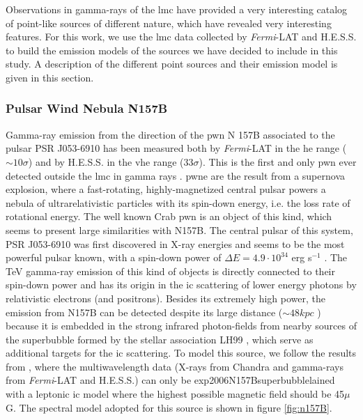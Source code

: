 \documentclass[main.tex]{subfiles}
\begin{document}
Observations in gamma-rays of the \gls{lmc} have provided a very interesting catalog of point-like sources of different nature, which have revealed very interesting features. For this work, we use the \gls{lmc} data collected by \textit{Fermi}-LAT \cite{2010FermiLATLMC11months} \cite{2016LMCFermiLAT} and H.E.S.S. \cite{2012HESSLMC} \cite{2015HESSTeVLMC} \cite{2017HESSLMCP3} to build the emission models of the sources we have decided to include in this study. A description of the different point sources and their emission model is given in this section.

\subsubsection{Pulsar Wind Nebula N157B}

Gamma-ray emission from the direction of the \gls{pwn} N 157B associated to the pulsar  PSR J053-6910 has been measured both by \textit{Fermi}-LAT in the \gls{he} range ($\sim 10 \sigma$) and by H.E.S.S. in the \gls{vhe} range ($33 \sigma$). This is the first and only \gls{pwn} ever detected outside the \gls{lmc} in gamma rays \cite{2012HESSN157B}. \gls{pwne} are the result from  a supernova explosion, where a fast-rotating, highly-magnetized central pulsar powers a nebula of ultrarelativistic particles with its spin-down energy, i.e. the loss rate of rotational energy. The well known Crab \gls{pwn} is an object of this kind, which seems to present large similarities with N157B. The central pulsar of this system, PSR J053-6910 was first discovered in X-ray energies and seems to be the most powerful pulsar known, with a spin-down power of $\Delta E = 4.9 \cdot 10^{34} $ erg s$^{-1}$ \cite{1998PulsarN157B}. The TeV gamma-ray emission of this kind of objects is directly connected to their spin-down power and has its origin in the \gls{ic} scattering of lower energy photons by relativistic electrons (and positrons). Besides its extremely high power, the emission from N157B can be detected despite its large distance ($\sim 48 kpc$ \cite{2006N157Bdistance}) because it is embedded in the strong infrared photon-fields from nearby sources of the superbubble formed by the stellar association LH99 \cite{}, which serve as additional targets for the \gls{ic} scattering.
To model this source, we follow the results from \cite{2015HESSTeVLMC}, where the multiwavelength data (X-rays from Chandra \cite{2001ChandraN157B} and gamma-rays from \textit{Fermi}-LAT and H.E.S.S.) can only be exp2006N157Bsuperbubblelained with a leptonic \gls{ic} model where the highest possible magnetic field should be 45$\mu$ G. The  spectral model adopted for this source is shown in figure \ref{fig:n157B}.
\end{document}

